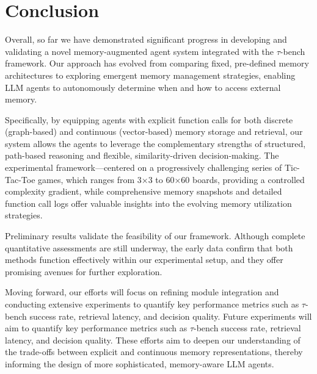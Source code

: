 \documentclass{article}
\begin{document}
\section{Conclusion}
Overall, so far we have demonstrated significant progress in developing and validating a novel memory-augmented agent system integrated with the $\tau$-bench framework. Our approach has evolved from comparing fixed, pre-defined memory architectures to exploring emergent memory management strategies, enabling LLM agents to autonomously determine when and how to access external memory.

Specifically, by equipping agents with explicit function calls for both discrete (graph-based) and continuous (vector-based) memory storage and retrieval, our system allows the agents to leverage the complementary strengths of structured, path-based reasoning and flexible, similarity-driven decision-making. The experimental framework—centered on a progressively challenging series of Tic-Tac-Toe games, which ranges from 3×3 to 60×60 boards, providing a controlled complexity gradient, while comprehensive memory snapshots and detailed function call logs offer valuable insights into the evolving memory utilization strategies.

Preliminary results validate the feasibility of our framework. Although complete quantitative assessments are still underway, the early data confirm that both methods function effectively within our experimental setup, and they offer promising avenues for further exploration.

Moving forward, our efforts will focus on refining module integration and conducting extensive experiments to quantify key performance metrics such as $\tau$-bench success rate, retrieval latency, and decision quality. Future experiments will aim to quantify key performance metrics such as $\tau$-bench success rate, retrieval latency, and decision quality. These efforts aim to deepen our understanding of the trade-offs between explicit and continuous memory representations, thereby informing the design of more sophisticated, memory-aware LLM agents.
\end{document}
